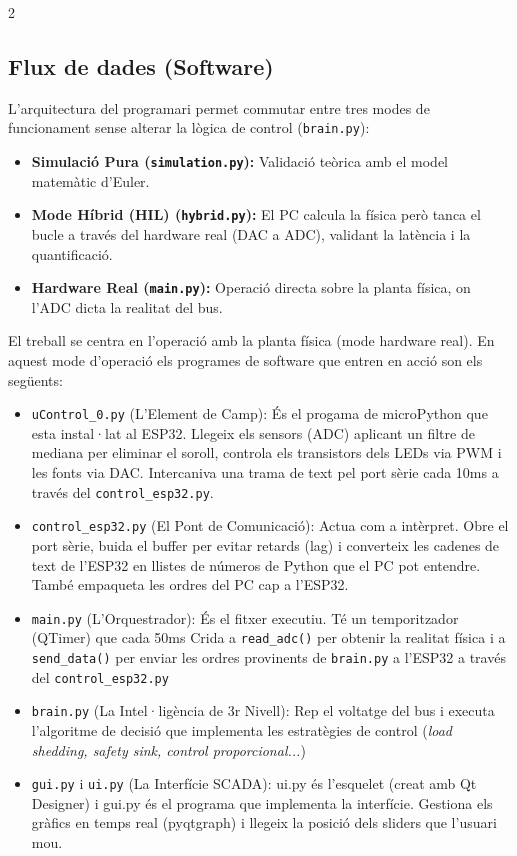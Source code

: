 \documentclass[11pt,a4paper]{article}
\begin{document}
\begin{multicols}{2}
    \subsection{Flux de dades (Software)}

    L'arquitectura del programari permet commutar entre tres modes de funcionament sense alterar la lògica de control (\texttt{brain.py}):
    \begin{itemize}
        \item \textbf{Simulació Pura (\texttt{simulation.py}):} Validació teòrica amb el model matemàtic d'Euler.
        \item \textbf{Mode Híbrid (HIL) (\texttt{hybrid.py}):} El PC calcula la física però tanca el bucle a través del hardware real (DAC a ADC), validant la latència i la quantificació.
        \item \textbf{Hardware Real (\texttt{main.py}):} Operació directa sobre la planta física, on l'ADC dicta la realitat del bus.
    \end{itemize}

    El treball se centra en l'operació amb la planta física (mode hardware real). En aquest mode d'operació els programes de software que entren en acció son els següents:

    \begin{itemize}
        \item \texttt{uControl\_0.py} (L'Element de Camp): És el progama de microPython que esta instal·lat al ESP32. Llegeix els sensors (ADC) aplicant un filtre de mediana per eliminar el soroll, controla els transistors dels LEDs via PWM i les fonts via DAC. Intercaniva una trama de text pel port sèrie cada 10ms a través del \texttt{control\_esp32.py}.
        \item \texttt{control\_esp32.py} (El Pont de Comunicació): Actua com a intèrpret. Obre el port sèrie, buida el buffer per evitar retards (lag) i converteix les cadenes de text de l'ESP32 en llistes de números de Python que el PC pot entendre. També empaqueta les ordres del PC cap a l'ESP32.
        \item \texttt{main.py} (L'Orquestrador): És el fitxer executiu. Té un temporitzador (QTimer) que cada 50ms Crida a \texttt{read\_adc()} per obtenir la realitat física i a \texttt{send\_data()} per enviar les ordres provinents de \texttt{brain.py} a l'ESP32 a través del \texttt{control\_esp32.py}
        \item \texttt{brain.py} (La Intel·ligència de 3r Nivell): Rep el voltatge del bus i executa l'algoritme de decisió que implementa les estratègies de control (\textit{load shedding, safety sink, control proporcional...})
        \item \texttt{gui.py} i \texttt{ui.py} (La Interfície SCADA): ui.py és l'esquelet (creat amb Qt Designer) i gui.py és el programa que implementa la interfície. Gestiona els gràfics en temps real (pyqtgraph) i llegeix la posició dels sliders que l'usuari mou.
    \end{itemize}


\end{multicols}
\end{document}
